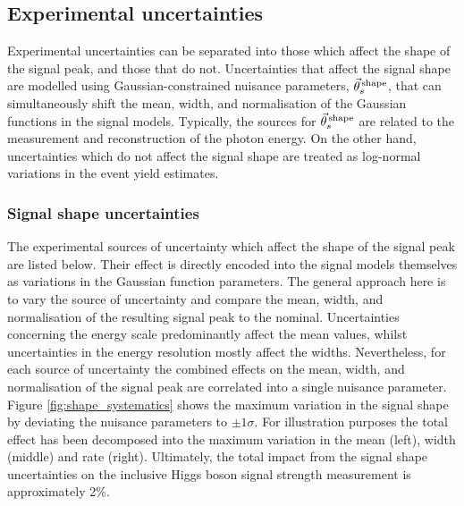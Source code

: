 \subsection{Experimental uncertainties}\label{sec:systematics_experimental}
Experimental uncertainties can be separated into those which affect the shape of the signal \mgg peak, and those that do not. Uncertainties that affect the signal shape are modelled using Gaussian-constrained nuisance parameters, $\vec{\theta}^{\,\rm{shape}}_{s}$, that can simultaneously shift the mean, width, and normalisation of the Gaussian functions in the signal models. Typically, the sources for $\vec{\theta}^{\,\rm{shape}}_{s}$ are related to the measurement and reconstruction of the photon energy. On the other hand, uncertainties which do not affect the signal shape are treated as log-normal variations in the event yield estimates. 

\subsubsection{Signal shape uncertainties}
The experimental sources of uncertainty which affect the shape of the signal \mgg peak are listed below. Their effect is directly encoded into the signal models themselves as variations in the Gaussian function parameters. The general approach here is to vary the source of uncertainty and compare the mean, width, and normalisation of the resulting signal \mgg peak to the nominal. Uncertainties concerning the energy scale predominantly affect the mean values, whilst uncertainties in the energy resolution mostly affect the widths. Nevertheless, for each source of uncertainty the combined effects on the mean, width, and normalisation of the signal peak are correlated into a single nuisance parameter. Figure \ref{fig:shape_systematics} shows the maximum variation in the signal shape by deviating the nuisance parameters to $\pm 1\sigma$. For illustration purposes the total effect has been decomposed into the maximum variation in the mean (left), width (middle) and rate (right). Ultimately, the total impact from the signal shape uncertainties on the inclusive Higgs boson signal strength measurement is approximately 2\%.

